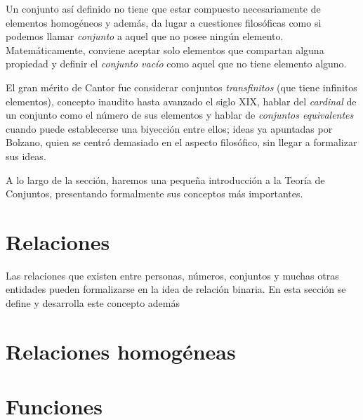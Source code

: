 Un conjunto así definido no tiene que estar compuesto necesariamente de
elementos homogéneos y además, da lugar a cuestiones filosóficas como si
podemos llamar \textit{conjunto} a aquel que no posee ningún elemento.
Matemáticamente, conviene aceptar solo elementos que compartan alguna propiedad
y definir el \textit{conjunto vacío} como aquel que no tiene elemento alguno.

El gran mérito de Cantor fue considerar conjuntos \textit{transfinitos} (que
tiene infinitos elementos), concepto inaudito hasta avanzado el siglo XIX,
hablar del \textit{cardinal} de un conjunto como el número de sus elementos y
hablar de \textit{conjuntos equivalentes} cuando puede establecerse una
biyección entre ellos; ideas ya apuntadas por Bolzano, quien se centró
demasiado en el aspecto filosófico, sin llegar a formalizar sus ideas.

A lo largo de la sección, haremos una pequeña introducción a la Teoría de
Conjuntos, presentando formalmente sus conceptos más importantes.





\section{Relaciones}

Las relaciones que existen entre personas, números, conjuntos y muchas
otras entidades pueden formalizarse en la idea de relación binaria. En esta 
sección se define y desarrolla este concepto además 


\section{Relaciones homogéneas}


\section{Funciones}


